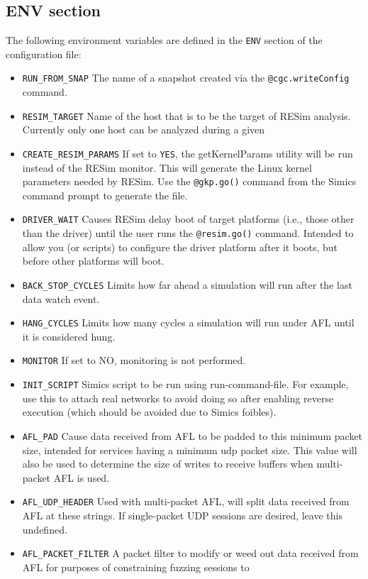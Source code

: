 \documentclass[titlepage]{article}
\begin{document}
\subsection{ENV section}
\label{env}
The following environment variables are defined in the {\tt ENV} section of the configuration file:
\begin{itemize}
\item {\tt RUN\_FROM\_SNAP} The name of a snapshot created via the {\tt @cgc.writeConfig} command.
\item {\tt RESIM\_TARGET} Name of the host that is to be the target of RESim analysis.  Currently only one host can be analyzed during a given
\item {\tt CREATE\_RESIM\_PARAMS} If set to {\tt YES}, the getKernelParams utility will be run instead of the RESim monitor.  This will
generate the Linux kernel parameters needed by RESim.  Use the {\tt @gkp.go()} command from the Simics command prompt to generate the file.
\item {\tt DRIVER\_WAIT} Causes RESim delay boot of target platforms (i.e., those other than the driver) until the 
user runs the {\tt @resim.go()} command.  Intended to allow you (or scripts)
to configure the driver platform after it boots, but before other platforms will boot.
\item {\tt BACK\_STOP\_CYCLES} Limits how far ahead a simulation will run after the last data watch event.
\item {\tt HANG\_CYCLES} Limits how many cycles a simulation will run under AFL until it is considered hung.
\item {\tt MONITOR} If set to NO, monitoring is not performed.
\item{\tt INIT\_SCRIPT} Simics script to be run using run-command-file.  For example, use this to attach real networks to avoid
doing so after enabling reverse execution (which should be avoided due to Simics foibles).
\item{\tt AFL\_PAD} Cause data received from AFL to be padded to this minimum packet size, intended for services having a minimum udp packet size.
This value will also be used to determine the size of writes to receive buffers when multi-packet AFL is used.
\item{\tt AFL\_UDP\_HEADER} Used with multi-packet AFL, will split data received from AFL at these strings.  If single-packet UDP sessions are desired,
leave this undefined.
\item{\tt AFL\_PACKET\_FILTER} A packet filter to modify or weed out data received from AFL for purposes of constraining fuzzing sessions to

\end{itemize}
\end{document}
